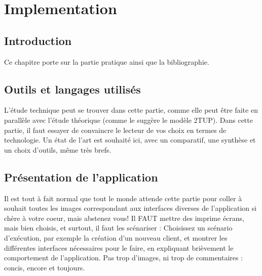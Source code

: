 
\setcounter{chapter}{2}
\chapter{Implementation}
\minitoc %
\graphicspath{{Chapitre3/figures/}}

\pagestyle{fancy}
\fancyhf{}
\fancyhead[R]{\bfseries\rightmark}
\fancyfoot[R]{\thepage}
\renewcommand{\headrulewidth}{0.5pt}
\renewcommand{\footrulewidth}{0pt}
\renewcommand{\chaptermark}[1]{\markboth{{\chaptername~\thechapter. #1 }}{}}
\renewcommand{\sectionmark}[1]{\markright{\thechapter.\thesection~ #1}}

\begin{spacing}{1.2}

\section*{Introduction}
Ce chapitre porte sur la partie pratique ainsi que la bibliographie.

\section{Outils et langages utilisés}
L'étude technique peut se trouver dans cette partie, comme elle peut être faite en
parallèle avec l'étude théorique (comme le suggère le modèle 2TUP).
Dans cette partie, il faut essayer de convaincre le lecteur de vos choix en termes de
technologie. Un état de l'art est souhaité ici, avec un comparatif, une synthèse et un choix 
d'outils, même très brefs.
\section{Présentation de l'application}
Il est tout à fait normal que tout le monde attende cette partie pour coller à souhait toutes les images
correspondant aux interfaces diverses de l'application si chère à votre coeur, mais
abstenez vous! Il FAUT mettre des imprime écrans, mais bien choisis, et surtout, il faut les scénariser : Choisissez un scénario d'exécution, par exemple la création d'un 
nouveau client, et montrer les différentes interfaces nécessaires pour le faire, en
expliquant brièvement le comportement de l'application. Pas trop d'images, ni trop de
commentaires : concis, encore et toujours.


\end{spacing}
